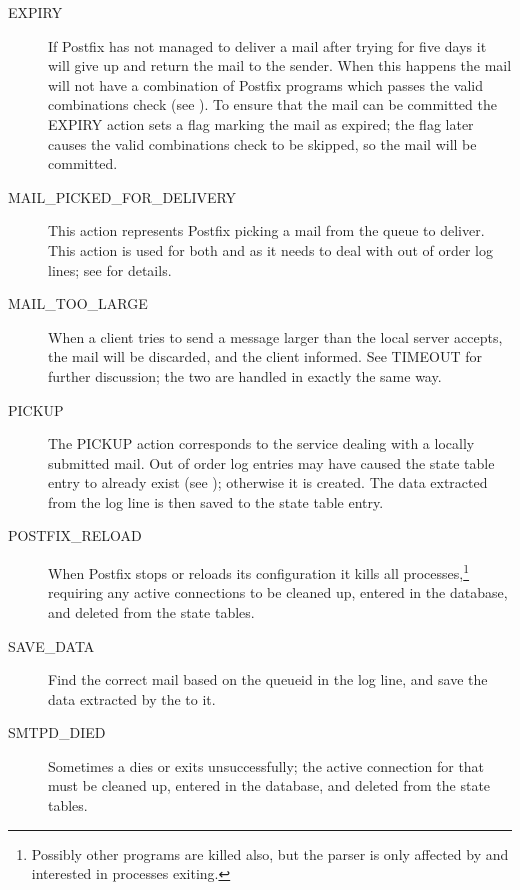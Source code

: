 \begin{description}
    \item [EXPIRY] If Postfix has not managed to deliver a mail after
        trying for five days it will give up and return the mail to the
        sender.  When this happens the mail will not have a combination of
        Postfix programs which passes the valid combinations check (see
        ).  To ensure that the mail can
        be committed the EXPIRY action sets a flag marking the mail as
        expired; the flag later causes the valid combinations check to be
        skipped, so the mail will be committed.

    \item [MAIL\_PICKED\_FOR\_DELIVERY] This action represents Postfix
        picking a mail from the queue to deliver. This action is used for
        both  and  as it needs to deal with
        out of order log lines; see 
        for details.

    \item [MAIL\_TOO\_LARGE] When a client tries to send a message larger
        than the local server accepts, the mail will be discarded, and the
        client informed.  See TIMEOUT for further discussion; the two are
        handled in exactly the same way.

    \item [PICKUP] The PICKUP action corresponds to the 
        service dealing with a locally submitted mail.  Out of order log
        entries may have caused the state table entry to already exist (see
        ); otherwise it is
        created.  The data extracted from the log line is then saved to the
        state table entry.

    \item [POSTFIX\_RELOAD] When Postfix stops or reloads its configuration
        it kills all  processes,\footnote{Possibly other
        programs are killed also, but the parser is only affected by and
        interested in  processes exiting.} requiring any
        active connections to be cleaned up, entered in the database, and
        deleted from the state tables.

    \item [SAVE\_DATA] Find the correct mail based on the queueid in
        the log line, and save the data extracted by the \regex{} to it.

    \item [SMTPD\_DIED] Sometimes a  dies or exits
        unsuccessfully; the active connection for that  must
        be cleaned up, entered in the database, and deleted from the state
        tables.


\end{description}
